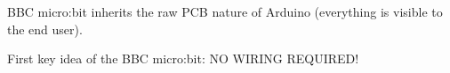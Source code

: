 BBC micro:bit inherits the raw PCB nature of Arduino (everything is visible to the end user).

First key idea of the BBC micro:bit: NO WIRING REQUIRED!




%
%
%
%
%
%
%
%
%
% 
%
%
%
%


